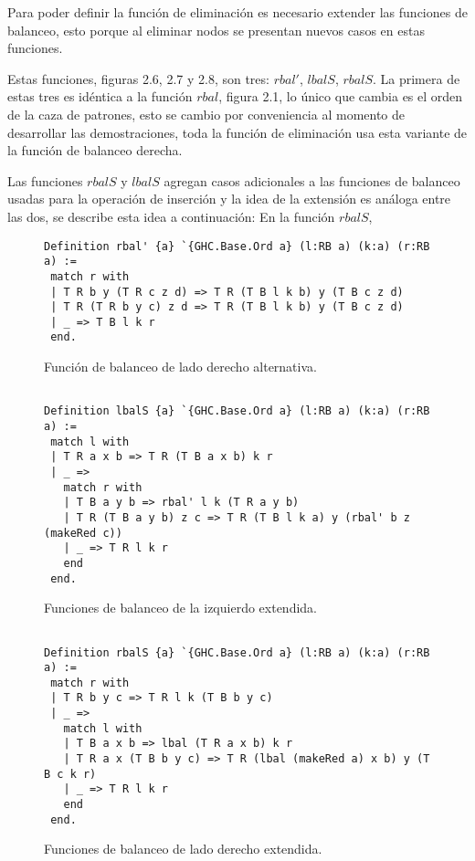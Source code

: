 \documentclass[letterpaper,12pt,oneside]{book}
\theoremstyle{plain}
\theoremstyle{definition}
\theoremstyle{remark}
\begin{document}
Para poder definir la funci\'on de eliminaci\'on es necesario extender las funciones de balanceo, esto 
porque al eliminar nodos se presentan nuevos casos en estas funciones.

Estas funciones, figuras 2.6, 2.7 y 2.8, son tres: $rbal'$, $lbalS$, $rbalS$. La primera de estas 
tres es idéntica a la función $rbal$, figura 2.1, lo \'unico que cambia es el orden de la caza de 
patrones, esto se cambio por conveniencia al momento de desarrollar las demostraciones, toda la 
funci\'on de eliminación usa esta variante de la funci\'on de balanceo derecha.


Las funciones $rbalS$ y $lbalS$ agregan casos adicionales a las funciones de balanceo usadas para la 
operaci\'on de inserci\'on y la idea de la extensión es análoga entre las dos, se describe esta idea a 
continuación:
En la funci\'on $rbalS$, 

\begin{figure}
\centering 
\captionsetup{justification=centering}
\begin{verbatim}
Definition rbal' {a} `{GHC.Base.Ord a} (l:RB a) (k:a) (r:RB a) :=
 match r with
 | T R b y (T R c z d) => T R (T B l k b) y (T B c z d)
 | T R (T R b y c) z d => T R (T B l k b) y (T B c z d)
 | _ => T B l k r
 end.

\end{verbatim}
\caption{Funci\'on de balanceo de lado derecho alternativa.}
\end{figure}

\begin{figure}
\centering 
\captionsetup{justification=centering}
\begin{verbatim}

Definition lbalS {a} `{GHC.Base.Ord a} (l:RB a) (k:a) (r:RB a) :=
 match l with
 | T R a x b => T R (T B a x b) k r
 | _ =>
   match r with
   | T B a y b => rbal' l k (T R a y b)
   | T R (T B a y b) z c => T R (T B l k a) y (rbal' b z (makeRed c))
   | _ => T R l k r 
   end
 end.

\end{verbatim}
\caption{Funciones de balanceo de la izquierdo extendida.}
\end{figure}

\begin{figure}
\centering 
\captionsetup{justification=centering}
\begin{verbatim}

Definition rbalS {a} `{GHC.Base.Ord a} (l:RB a) (k:a) (r:RB a) :=
 match r with
 | T R b y c => T R l k (T B b y c)
 | _ =>
   match l with
   | T B a x b => lbal (T R a x b) k r
   | T R a x (T B b y c) => T R (lbal (makeRed a) x b) y (T B c k r)
   | _ => T R l k r 
   end
 end.

\end{verbatim}
\caption{Funciones de balanceo de lado derecho extendida.}
\end{figure}
\end{document}
